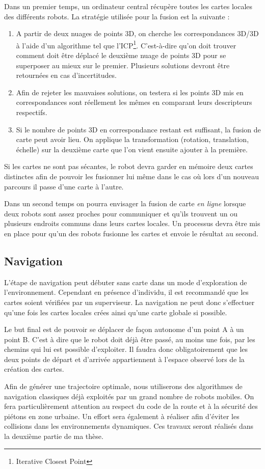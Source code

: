 Dans un premier temps, un ordinateur central récupère toutes les cartes locales des différents robots.
La stratégie utilisée pour la fusion est la suivante :
\begin{enumerate}
\item A partir de deux nuages de points 3D, on cherche les correspondances 3D/3D à l'aide d'un algorithme tel que l'ICP\footnote{Iterative Closest Point}.
C'est-à-dire qu'on doit trouver comment doit être déplacé le deuxième nuage de points 3D pour se superposer au mieux sur le premier.
Plusieurs solutions devront être retournées en cas d'incertitudes.
\item Afin de rejeter les mauvaises solutions, on testera si les points 3D mis en correspondances sont réellement les mêmes en comparant leurs descripteurs respectifs.
\item Si le nombre de points 3D en correspondance restant est suffisant, la fusion de carte peut avoir lieu.
On applique la transformation (rotation, translation, échelle) sur la deuxième carte que l'on vient ensuite ajouter à la première.
\end{enumerate}

Si les cartes ne sont pas sécantes, le robot devra garder en mémoire deux cartes distinctes afin de pouvoir les fusionner lui même dans le cas où lors d'un nouveau parcours il passe d'une carte à l'autre.

Dans un second temps on pourra envisager la fusion de carte \emph{en ligne} lorsque deux robots sont assez proches pour communiquer et qu'ils trouvent un ou plusieurs endroits communs dans leurs cartes locales.
Un processus devra être mis en place pour qu'un des robots fusionne les cartes et envoie le résultat au second.

\subsection{Navigation}

L'étape de navigation peut débuter sans carte dans un mode d'exploration de l'environnement.
Cependant en présence d'individu, il est recommandé que les cartes soient vérifiées par un superviseur.
La navigation ne peut donc s'effectuer qu'une fois les cartes locales crées ainsi qu'une carte globale si possible.

Le but final est de pouvoir se déplacer de façon autonome d'un point A à un point B.
C'est à dire que le robot doit déjà être passé, au moins une fois, par les chemins qui lui est possible d'exploiter.
Il faudra donc obligatoirement que les deux points de départ et d'arrivée appartiennent à l'espace observé lors de la création des cartes.

Afin de générer une trajectoire optimale, nous utiliserons des algorithmes de navigation classiques déjà exploités par un grand nombre de robots mobiles.
On fera particulièrement attention au respect du code de la route et à la sécurité des piétons en zone urbaine.
Un effort sera également à réaliser afin d'éviter les collisions dans les environnements dynamiques.
Ces travaux seront réalisés dans la deuxième partie de ma thèse. 

